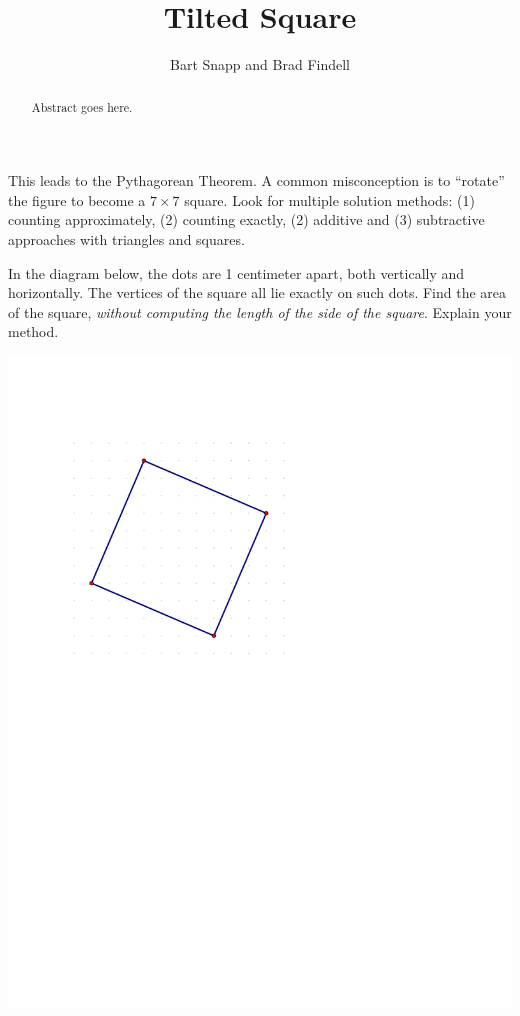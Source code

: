 \documentclass{ximera}
\author{Bart Snapp and Brad Findell}
\title{Tilted Square}
\begin{document}
\begin{abstract}
Abstract goes here.  
\end{abstract}
\maketitle


\begin{instructorIntro}
This leads to the Pythagorean Theorem.  A common misconception is to ``rotate'' the figure to become a $7\times 7$ square.  Look for multiple solution methods:  (1) counting approximately, (2) counting exactly, (2) additive and (3) subtractive approaches with triangles and squares.
\end{instructorIntro}

\begin{problem}
In the diagram below, the dots are 1 centimeter apart, both vertically and horizontally.  The vertices of the square all lie exactly on such dots. Find the area of the square, \emph{without computing the length of the side of the square}.  Explain your method.  

\begin{image}
\includegraphics{./graphics/tiltedSquare}
\end{image}

\end{problem}
\end{document}
